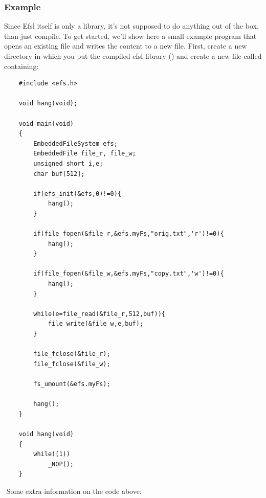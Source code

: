 \subsubsection{Example}
Since Efsl itself is only a library, it's not supposed to do anything out of 
the box, than just compile. To get started, we'll show here a small example
program that opens an existing file and writes the content to a new file.
\newline\newline
First, create a new directory in which you put the compiled efsl-library 
() and create a new file called  containing:
\lstset{numbers=left, stepnumber=1, numberstyle=\small, numbersep=5pt, tabsize=4}
\begin{lstlisting}
	#include <efs.h>

	void hang(void);

	void main(void)
	{
		EmbeddedFileSystem efs;
		EmbeddedFile file_r, file_w;
		unsigned short i,e;
		char buf[512];

		if(efs_init(&efs,0)!=0){
			hang();
		}

		if(file_fopen(&file_r,&efs.myFs,"orig.txt",'r')!=0){
			hang();
		}

		if(file_fopen(&file_w,&efs.myFs,"copy.txt",'w')!=0){
			hang();
		}

		while(e=file_read(&file_r,512,buf)){
			file_write(&file_w,e,buf);
		}

		file_fclose(&file_r);
		file_fclose(&file_w);

		fs_umount(&efs.myFs);

		hang();
	}

	void hang(void)
	{
		while((1))
			_NOP();
	}
\end{lstlisting}
$ $\newline
Some extra information on the code above:
